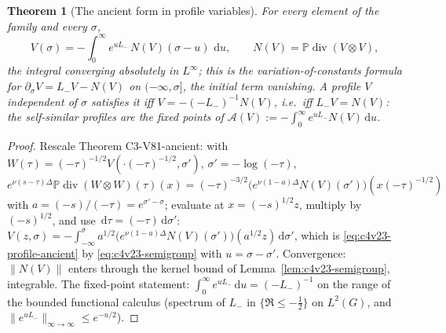 \documentclass[11pt]{article}
\newcommand{\dd}{\,\mathrm d}
\newcommand{\PP}{\mathbb P}
\theoremstyle{plain}
\newtheorem{theorem}{Theorem}[section]
\theoremstyle{definition}
\theoremstyle{remark}
\begin{document}
\begin{theorem}[The ancient form in profile variables]
\label{thm:c4v23-profile-ancient}
For every element of the family and every \(\sigma\),
\begin{equation}
 \boxed{\quad
 V(\sigma)=-\int_0^\infty e^{uL_-}\,N(V)(\sigma-u)\,\dd u,\qquad N(V)=\PP\operatorname{div}(V\otimes V),
 \quad}
 \label{eq:c4v23-profile-ancient}
\end{equation}
the integral converging absolutely in \(L^\infty\); this is the
variation-of-constants formula for \(\partial_\sigma V=L_-V-N(V)\) on \((-\infty,\sigma]\), the
initial term vanishing.  A profile \(V\) independent of \(\sigma\) satisfies it
iff \(V=-(-L_-)^{-1}N(V)\), i.e.\ iff \(L_-V=N(V)\): the self-similar profiles are
the fixed points of \(\mathcal A(V):=-\int_0^\infty e^{uL_-}N(V)\dd u\).
\end{theorem}

\begin{proof}
Rescale Theorem C3-V81-ancient: with \(W(\tau)=(-\tau)^{-1/2}V(\cdot(-\tau)^{-1/2},\sigma')\), \(\sigma'=-\log(-\tau)\),
\(e^{\nu(s-\tau)\Delta}\PP\operatorname{div}(W\otimes W)(\tau)(x)=(-\tau)^{-3/2}\bigl(e^{\nu(1-a)\Delta}N(V)(\sigma')\bigr)(x(-\tau)^{-1/2})\) with \(a=(-s)/(-\tau)=e^{\sigma'-\sigma}\);
evaluate at \(x=(-s)^{1/2}z\), multiply by \((-s)^{1/2}\), and use \(\dd\tau=(-\tau)\dd\sigma'\):
\(V(z,\sigma)=-\int_{-\infty}^\sigma a^{1/2}\bigl(e^{\nu(1-a)\Delta}N(V)(\sigma')\bigr)(a^{1/2}z)\dd\sigma'\), which is
\eqref{eq:c4v23-profile-ancient} by \eqref{eq:c4v23-semigroup} with \(u=\sigma-\sigma'\).
Convergence: \(\|N(V)\|\) enters through the kernel bound of Lemma~\ref{lem:c4v23-semigroup},
integrable.  The fixed-point statement: \(\int_0^\infty e^{uL_-}\dd u=(-L_-)^{-1}\) on the
range of the bounded functional calculus (spectrum of \(L_-\) in
\(\{\Re\le-\frac12\}\) on \(L^2(G)\), and \(\|e^{uL_-}\|_{\infty\to\infty}\le e^{-u/2}\)).
\end{proof}
\end{document}
